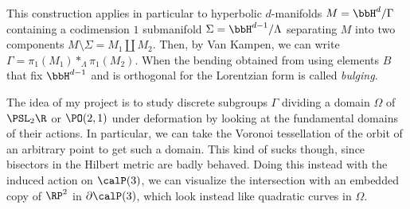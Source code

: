 \documentclass{article}
\begin{document}
This construction applies in particular to hyperbolic $d$-manifolds $M = \bbH^d/\Gamma$ containing a codimension $1$ submanifold $\Sigma = \bbH^{d - 1}/\Lambda$ separating $M$ into two components $M\setminus\Sigma = M_1 \amalg M_2$. Then, by Van Kampen, we can write $\Gamma = \pi_1(M_1) *_{\Lambda} \pi_1(M_2)$. When the bending obtained from using elements $B$ that fix $\bbH^{d - 1}$ and is orthogonal for the Lorentzian form is called \textit{bulging}.

The idea of my project is to study discrete subgroups $\Gamma$ dividing a domain $\Omega$ of $\PSL_2\R$ or $\PO(2,1)$ under deformation by looking at the fundamental domains of their actions. In particular, we can take the Voronoi tessellation of the orbit of an arbitrary point to get such a domain. This kind of sucks though, since bisectors in the Hilbert metric are badly behaved. Doing this instead with the induced action on $\calP(3)$, we can visualize the intersection with an embedded copy of $\RP^2$ in $\partial\calP(3)$, which look instead like quadratic curves in $\Omega$.
\end{document}
